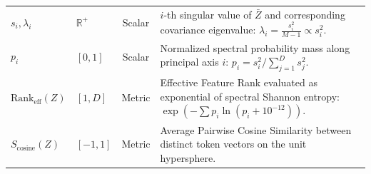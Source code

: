 \documentclass{article}
\begin{document}
\begin{table}[ht]
{\begin{tabular}{llcp{8.2cm}}
$s_i, \lambda_i$ & $\mathbb{R}^+$ & Scalar & $i$-th singular value of $\bar{Z}$ and corresponding covariance eigenvalue: $\lambda_i = \frac{s_i^2}{M-1} \propto s_i^2$. \\
$p_i$ & $[0, 1]$ & Scalar & Normalized spectral probability mass along principal axis $i$: $p_i = s_i^2 / \sum_{j=1}^D s_j^2$. \\
$\text{Rank}_{\text{eff}}(Z)$ & $[1, D]$ & Metric & Effective Feature Rank evaluated as exponential of spectral Shannon entropy: $\exp(-\sum p_i \ln(p_i + 10^{-12}))$. \\
$S_{\text{cosine}}(Z)$ & $[-1, 1]$ & Metric & Average Pairwise Cosine Similarity between distinct token vectors on the unit hypersphere. \\
\bottomrule
\end{tabular}%
}
\end{table}
\end{document}
